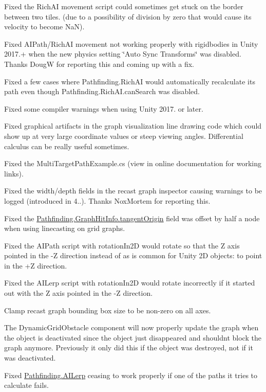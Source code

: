 \begin{DoxyItemize}
\begin{DoxyItemize}
\begin{DoxyItemize}
\item Fixed the Rich\+AI movement script could sometimes get stuck on the border between two tiles. (due to a possibility of division by zero that would cause its velocity to become NaN).
\item Fixed A\+I\+Path/\+Rich\+AI movement not working properly with rigidbodies in Unity 2017.+ when the new physics setting \char`\"{}\+Auto Sync Transforms\char`\"{} was disabled. Thanks DougW for reporting this and coming up with a fix.
\item Fixed a few cases where Pathfinding.\+Rich\+AI would automatically recalculate its path even though Pathfinding.\+Rich\+A\+I.\+can\+Search was disabled.
\item Fixed some compiler warnings when using Unity 2017. or later.
\item Fixed graphical artifacts in the graph visualization line drawing code which could show up at very large coordinate values or steep viewing angles. Differential calculus can be really useful sometimes.
\item Fixed the Multi\+Target\+Path\+Example.\+cs (view in online documentation for working links).
\item Fixed the width/depth fields in the recast graph inspector causing warnings to be logged (introduced in 4..). Thanks Nox\+Mortem for reporting this.
\item Fixed the \mbox{\hyperlink{struct_pathfinding_1_1_graph_hit_info_a3e01461305a554b148543ecac8d27ab7}{Pathfinding.\+Graph\+Hit\+Info.\+tangent\+Origin}} field was offset by half a node when using linecasting on grid graphs.
\item Fixed the A\+I\+Path script with rotation\+In2D would rotate so that the Z axis pointed in the -\/Z direction instead of as is common for Unity 2D objects\+: to point in the +Z direction.
\item Fixed the A\+I\+Lerp script with rotation\+In2D would rotate incorrectly if it started out with the Z axis pointed in the -\/Z direction.
\item Clamp recast graph bounding box size to be non-\/zero on all axes.
\item The Dynamic\+Grid\+Obstacle component will now properly update the graph when the object is deactivated since the object just disappeared and shouldn\textquotesingle{}t block the graph anymore. Previously it only did this if the object was destroyed, not if it was deactivated.
\item Fixed \mbox{\hyperlink{class_pathfinding_1_1_a_i_lerp}{Pathfinding.\+A\+I\+Lerp}} ceasing to work properly if one of the paths it tries to calculate fails.

\end{DoxyItemize}
\end{DoxyItemize}
\end{DoxyItemize}
